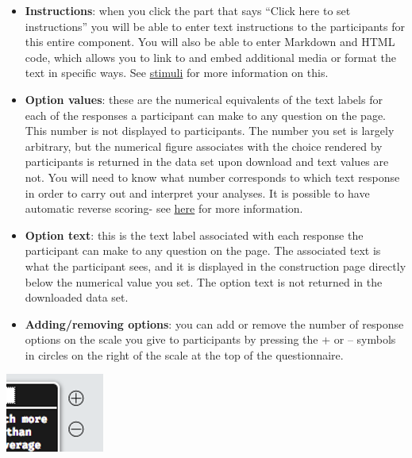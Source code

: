 \documentclass[]{book}
\providecommand{\tightlist}{%
  \setlength{\itemsep}{0pt}\setlength{\parskip}{0pt}}
\begin{document}
\begin{itemize}
\tightlist
\item
  \textbf{Instructions}: when you click the part that says ``Click here
  to set instructions'' you will be able to enter text instructions to
  the participants for this entire component. You will also be able to
  enter Markdown and HTML code, which allows you to link to and embed
  additional media or format the text in specific ways. See
  \protect\hyperlink{htmlstim}{stimuli} for more information on this.
\item
  \textbf{Option values}: these are the numerical equivalents of the
  text labels for each of the responses a participant can make to any
  question on the page. This number is not displayed to participants.
  The number you set is largely arbitrary, but the numerical figure
  associates with the choice rendered by participants is returned in the
  data set upon download and text values are not. You will need to know
  what number corresponds to which text response in order to carry out
  and interpret your analyses. It is possible to have automatic reverse
  scoring- see \protect\hyperlink{fwdrev}{here} for more information.
\item
  \textbf{Option text}: this is the text label associated with each
  response the participant can make to any question on the page. The
  associated text is what the participant sees, and it is displayed in
  the construction page directly below the numerical value you set. The
  option text is not returned in the downloaded data set.
\item
  \textbf{Adding/removing options}: you can add or remove the number of
  response options on the scale you give to participants by pressing the
  + or -- symbols in circles on the right of the scale at the top of the
  questionnaire.
\end{itemize}

\includegraphics{images/screenshots/radio_2.png}
\end{document}

